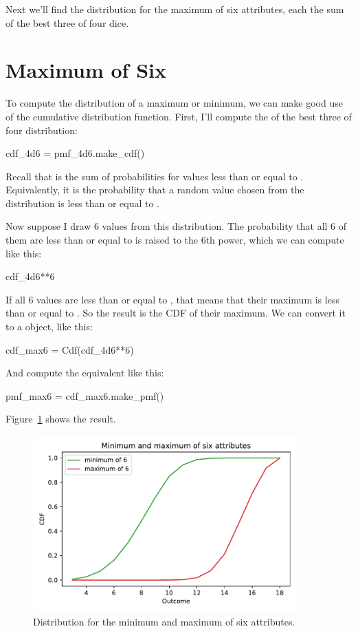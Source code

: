 \documentclass[12pt]{book}
\theoremstyle{exercise}
\begin{document}
Next we'll find the distribution for the maximum of six attributes, each the sum of the best three of four dice.


\section{Maximum of Six}

To compute the distribution of a maximum or minimum, we can make good use of the cumulative distribution function.
First, I'll compute the  of the best three of four distribution:

\begin{code}
cdf_4d6 = pmf_4d6.make_cdf()
\end{code}

Recall that  is the sum of probabilities for values less than or equal to .
Equivalently, it is the probability that a random value chosen from the distribution is less than or equal to .

Now suppose I draw 6 values from this distribution.
The probability that all 6 of them are less than or equal to  is  raised to the 6th power, which we can compute like this:

\begin{code}
cdf_4d6**6
\end{code}

If all 6 values are less than or equal to , that means that their maximum is less than or equal to .
So the result is the CDF of their maximum.
We can convert it to a  object, like this:

\begin{code}
cdf_max6 = Cdf(cdf_4d6**6)
\end{code}

And compute the equivalent  like this:

\begin{code}
pmf_max6 = cdf_max6.make_pmf()
\end{code}

Figure~\ref{fig06-03} shows the result.

\begin{figure}
\centerline{\includegraphics[width=4in]{figs/fig06-03.pdf}}
\caption{Distribution for the minimum and maximum of six attributes.}
\label{fig06-03}
\end{figure}
\end{document}
